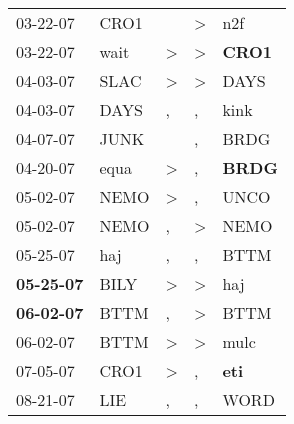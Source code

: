 \begin{supertabular}{p{0.07\textwidth}p{0.06\textwidth}p{0.02\textwidth}p{0.02\textwidth}p{0.06\textwidth}}
          03-22-07\textsuperscript{} &           CRO1\textsuperscript{} &                  &     \textgreater &            n2f\textsuperscript{} \\
          03-22-07\textsuperscript{} &           wait\textsuperscript{} &     \textgreater &     \textgreater &  \textbf{CRO1\textsuperscript{}} \\
          04-03-07\textsuperscript{} &           SLAC\textsuperscript{} &     \textgreater &     \textgreater &           DAYS\textsuperscript{} \\
          04-03-07\textsuperscript{} &           DAYS\textsuperscript{} &                , &                , &           kink\textsuperscript{} \\
          04-07-07\textsuperscript{} &           JUNK\textsuperscript{} &                  &                , &           BRDG\textsuperscript{} \\
          04-20-07\textsuperscript{} &           equa\textsuperscript{} &     \textgreater &                , &  \textbf{BRDG\textsuperscript{}} \\
          05-02-07\textsuperscript{} &           NEMO\textsuperscript{} &     \textgreater &                , &           UNCO\textsuperscript{} \\
          05-02-07\textsuperscript{} &           NEMO\textsuperscript{} &                , &     \textgreater &           NEMO\textsuperscript{} \\
          05-25-07\textsuperscript{} &            haj\textsuperscript{} &                , &                , &           BTTM\textsuperscript{} \\
 \textbf{05-25-07\textsuperscript{}} &           BILY\textsuperscript{} &     \textgreater &     \textgreater &            haj\textsuperscript{} \\
 \textbf{06-02-07\textsuperscript{}} &           BTTM\textsuperscript{} &                , &     \textgreater &           BTTM\textsuperscript{} \\
          06-02-07\textsuperscript{} &           BTTM\textsuperscript{} &     \textgreater &     \textgreater &           mulc\textsuperscript{} \\
          07-05-07\textsuperscript{} &           CRO1\textsuperscript{} &     \textgreater &                , &   \textbf{eti\textsuperscript{}} \\
          08-21-07\textsuperscript{} &            LIE\textsuperscript{} &                , &                , &           WORD\textsuperscript{} \\

\end{supertabular}
